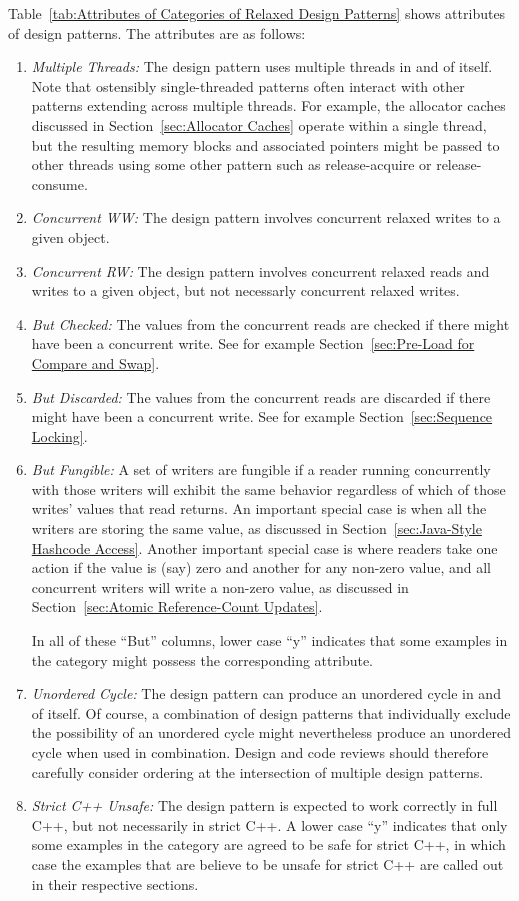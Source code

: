 \documentclass[10]{article}
\begin{document}
Table~\ref{tab:Attributes of Categories of Relaxed Design Patterns}
shows attributes of design patterns.
The attributes are as follows:

\begin{enumerate}
\item	\emph{Multiple Threads:}  The design pattern uses multiple threads
	in and of itself.
	Note that ostensibly single-threaded patterns often interact
	with other patterns extending across multiple threads.
	For example, the allocator caches discussed in
	Section~\ref{sec:Allocator Caches}
	operate within a single thread, but the resulting memory blocks
	and associated pointers might be passed to other threads using
	some other pattern such as release-acquire or release-consume.
\item	\emph{Concurrent WW:}  The design pattern involves concurrent
	relaxed writes to a given object.
\item	\emph{Concurrent RW:}  The design pattern involves concurrent
	relaxed reads and writes to a given object, but not necessarly
	concurrent relaxed writes.
\item	\emph{But Checked:}  The values from the concurrent reads are
	checked if there might have been a concurrent write.
	See for example
	Section~\ref{sec:Pre-Load for Compare and Swap}.
\item	\emph{But Discarded:}  The values from the concurrent reads are
	discarded if there might have been a concurrent write.
	See for example Section~\ref{sec:Sequence Locking}.
\item	\emph{But Fungible:}  A set of writers are fungible if
	a reader running concurrently with those writers will exhibit
	the same behavior regardless of which of those writes' values
	that read returns.
	An important special case is when all the writers are storing
	the same value, as discussed in
	Section~\ref{sec:Java-Style Hashcode Access}.
	Another important special case is where readers take one
	action if the value is (say) zero and another for any
	non-zero value, and all concurrent writers will write
	a non-zero value, as discussed in
	Section~\ref{sec:Atomic Reference-Count Updates}.

	In all of these ``But'' columns, lower case ``y'' indicates
	that some examples in the category might possess the corresponding
	attribute.
\item	\emph{Unordered Cycle:}  The design pattern can produce an
	unordered cycle in and of itself.
	Of course, a combination of design patterns that individually
	exclude the possibility of an unordered cycle might nevertheless
	produce an unordered cycle when used in combination.
	Design and code reviews should therefore carefully consider
	ordering at the intersection of multiple design patterns.
\item	\emph{Strict C++ Unsafe:} The design pattern is expected to
	work correctly in full C++, but not necessarily in strict C++.
	A lower case ``y'' indicates that only some examples in the
	category are agreed to be safe for strict C++, in which case
	the examples that are believe to be unsafe for strict C++
	are called out in their respective sections.
\end{enumerate}
\end{document}
